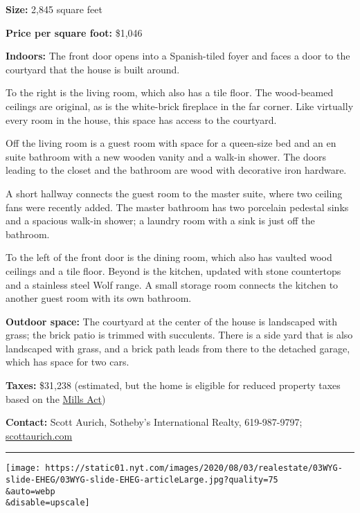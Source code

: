 \textbf{Size:} 2,845 square feet

\textbf{Price per square foot:} \$1,046

\textbf{Indoors:} The front door opens into a Spanish-tiled foyer and
faces a door to the courtyard that the house is built around.

To the right is the living room, which also has a tile floor. The
wood-beamed ceilings are original, as is the white-brick fireplace in
the far corner. Like virtually every room in the house, this space has
access to the courtyard.

Off the living room is a guest room with space for a queen-size bed and
an en suite bathroom with a new wooden vanity and a walk-in shower. The
doors leading to the closet and the bathroom are wood with decorative
iron hardware.

A short hallway connects the guest room to the master suite, where two
ceiling fans were recently added. The master bathroom has two porcelain
pedestal sinks and a spacious walk-in shower; a laundry room with a sink
is just off the bathroom.

To the left of the front door is the dining room, which also has vaulted
wood ceilings and a tile floor. Beyond is the kitchen, updated with
stone countertops and a stainless steel Wolf range. A small storage room
connects the kitchen to another guest room with its own bathroom.

\textbf{Outdoor space:} The courtyard at the center of the house is
landscaped with grass; the brick patio is trimmed with succulents. There
is a side yard that is also landscaped with grass, and a brick path
leads from there to the detached garage, which has space for two cars.

\textbf{Taxes:} \$31,238 (estimated, but the home is eligible for
reduced property taxes based on the
\href{http://www.ohp.parks.ca.gov/?page_id=21412}{Mills Act})

\textbf{Contact:} Scott Aurich, Sotheby's International Realty,
619-987-9797;
\href{https://www.scottaurich.com/properties/Listing_e2df4893-3e35-489f-ac7f-ad623e356c16--200+Palm+Avenue-Coronado-CA-92118_pacificsothebysfullsandicorcombined2d636fb1a6b45dcd02912b96ad8d6dfe.html}{scottaurich.com}

\begin{center}\rule{0.5\linewidth}{\linethickness}\end{center}

\texttt{[image: https://static01.nyt.com/images/2020/08/03/realestate/03WYG-slide-EHEG/03WYG-slide-EHEG-articleLarge.jpg?quality=75\\\&auto=webp\\\&disable=upscale]}

